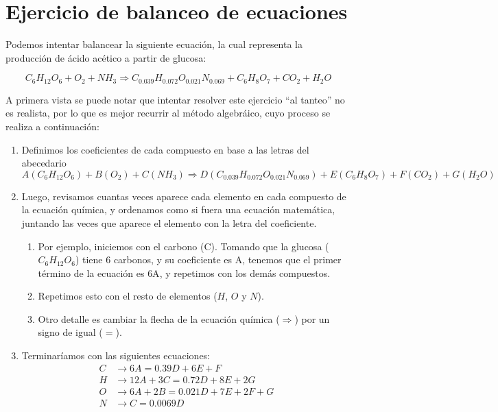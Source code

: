 


\section{Ejercicio de balanceo de ecuaciones}

Podemos intentar balancear la siguiente ecuación, la cual representa la producción de ácido acético a partir de glucosa:

\begin{equation*}
    C_{6}H_{12}O_{6} + O_{2} + NH_{3} \Longrightarrow C_{0.039}H_{0.072}O_{0.021}N_{0.069} + C_{6}H_{8}O_{7} + CO_{2} + H_{2}O
\end{equation*}

A primera vista se puede notar que intentar resolver este ejercicio ``al tanteo'' no es realista, por lo que es mejor recurrir al método algebráico, cuyo proceso se realiza a continuación:

\begin{enumerate}
    
    \item Definimos los coeficientes de cada compuesto en base a las letras del abecedario
        \begin{equation*}
            A(C_{6}H_{12}O_{6}) + B(O_{2}) + C(NH_{3}) \Longrightarrow D(C_{0.039}H_{0.072}O_{0.021}N_{0.069}) + E(C_{6}H_{8}O_{7}) + F(CO_{2}) + G(H_{2}O)
        \end{equation*}

    \item Luego, revisamos cuantas veces aparece cada elemento en cada compuesto de la ecuación química, y ordenamos como si fuera una ecuación matemática, juntando las veces que aparece el elemento con la letra del coeficiente.
        \begin{enumerate}
	        \item Por ejemplo, iniciemos con el carbono (C). Tomando que la glucosa ($C_{6}H_{12}O_{6}$) tiene 6 carbonos, y su coeficiente es A, tenemos que el primer término de la ecuación es $\text{6A}$, y repetimos con los demás compuestos.
	        \item Repetimos esto con el resto de elementos ($H$, $O$ y $N$).
	        \item Otro detalle es cambiar la flecha de la ecuación química ($\Longrightarrow$) por un signo de igual ($=$).
        \end{enumerate}

    \item Terminaríamos con las siguientes ecuaciones:
        \begin{align*}
            C &\longrightarrow 6A = 0.39D + 6E + F \\ H &\longrightarrow 12A + 3C = 0.72D + 8E + 2G \\ O &\longrightarrow 6A + 2B = 0.021D + 7E + 2F + G \\ N &\longrightarrow C = 0.0069D
        \end{align*}
\end{enumerate}

